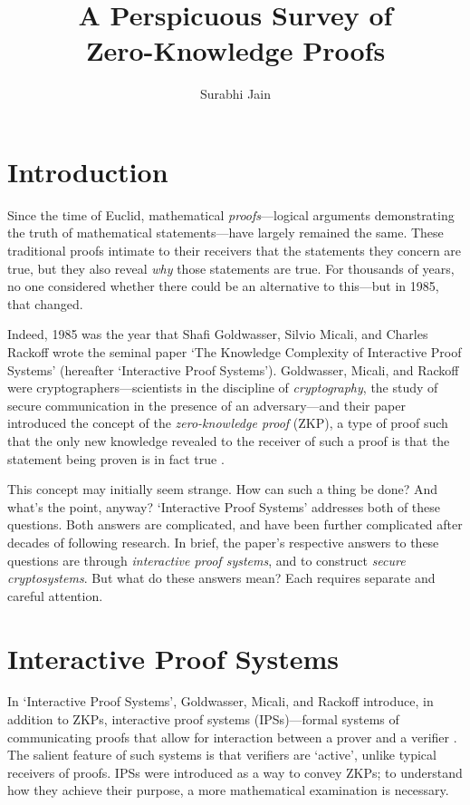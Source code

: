 \documentclass{article}
\title{\textbf{A Perspicuous Survey of \\ Zero-Knowledge Proofs}}
\author{Surabhi Jain}
\date{}
\begin{document}
\maketitle


\section{Introduction}

Since the time of Euclid, mathematical \textit{proofs}---logical arguments demonstrating the truth of mathematical statements---have largely remained the same. These traditional proofs intimate to their receivers that the statements they concern are true, but they also reveal \textit{why} those statements are true. For thousands of years, no one considered whether there could be an alternative to this---but in 1985, that changed.

Indeed, 1985 was the year that Shafi Goldwasser, Silvio Micali, and Charles Rackoff wrote the seminal paper `The Knowledge Complexity of Interactive Proof Systems' (hereafter `Interactive Proof Systems'). Goldwasser, Micali, and Rackoff were cryptographers---scientists in the discipline of \textit{cryptography}, the study of secure communication in the presence of an adversary---and their paper introduced the concept of the \textit{zero-knowledge proof} (ZKP), a type of proof such that the only new knowledge revealed to the receiver of such a proof is that the statement being proven is in fact true \cite{GMR}.

This concept may initially seem strange. How can such a thing be done? And what's the point, anyway? `Interactive Proof Systems' addresses both of these questions. Both answers are complicated, and have been further complicated after decades of following research. In brief, the paper's respective answers to these questions are through \textit{interactive proof systems}, and to construct \textit{secure cryptosystems}. But what do these answers mean? Each requires separate and careful attention.


\section{Interactive Proof Systems}

In `Interactive Proof Systems', Goldwasser, Micali, and Rackoff introduce, in addition to ZKPs, interactive proof systems (IPSs)---formal systems of communicating proofs that allow for interaction between a prover and a verifier \cite{GMR}. The salient feature of such systems is that verifiers are `active', unlike typical receivers of proofs. IPSs were introduced as a way to convey ZKPs; to understand how they achieve their purpose, a more mathematical examination is necessary.
\end{document}
